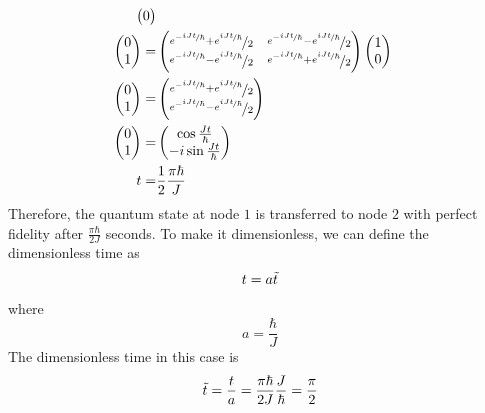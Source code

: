 \documentclass[aps]{revtex4-2}
\begin{document}
\begin{align}
\begin{pmatrix}
        0
    \end{pmatrix}\nonumber\\
    \begin{pmatrix}
        0\\
        1
    \end{pmatrix}=&\begin{pmatrix}
        \nicefrac{e^{-\nicefrac{iJt}{\hbar}}+e^{\nicefrac{iJt}{\hbar}}}{2}&\nicefrac{e^{-\nicefrac{iJt}{\hbar}}-e^{\nicefrac{iJt}{\hbar}}}{2}\\
        \nicefrac{e^{-\nicefrac{iJt}{\hbar}}-e^{\nicefrac{iJt}{\hbar}}}{2}&\nicefrac{e^{-\nicefrac{iJt}{\hbar}}+e^{\nicefrac{iJt}{\hbar}}}{2}
    \end{pmatrix}\begin{pmatrix}
        1\\
        0
    \end{pmatrix}\nonumber\\
    \begin{pmatrix}
        0\\
        1
    \end{pmatrix}=&\begin{pmatrix}
        \nicefrac{e^{-\nicefrac{iJt}{\hbar}}+e^{\nicefrac{iJt}{\hbar}}}{2}\\
        \nicefrac{e^{-\nicefrac{iJt}{\hbar}}-e^{\nicefrac{iJt}{\hbar}}}{2}
    \end{pmatrix}\nonumber\\
    \begin{pmatrix}
        0\\
        1
    \end{pmatrix}=&\begin{pmatrix}
        \cos{\frac{Jt}{\hbar}}\\
        -i\sin{\frac{Jt}{\hbar}}
    \end{pmatrix}\nonumber\\
    t=&\frac{1}{2}\frac{\pi\hbar}{J}
\end{align}
Therefore, the quantum state at node $1$ is transferred to node $2$ with perfect fidelity after $\frac{\pi\hbar}{2J}$ seconds.
To make it dimensionless, we can define the dimensionless time as
\begin{equation}
    t=a\Tilde{t}
\end{equation}
where
\begin{equation}
    a=\frac{\hbar}{J}
\end{equation}
The dimensionless time in this case is
\begin{equation}
    \Tilde{t}=\frac{t}{a}=\frac{\pi\hbar}{2J}\frac{J}{\hbar}=\frac{\pi}{2}
\end{equation}
\end{document}
